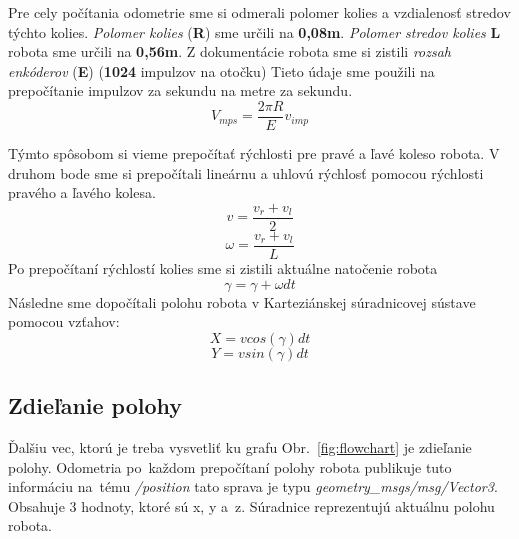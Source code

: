 Pre cely počítania odometrie sme si odmerali polomer kolies a vzdialenosť stredov týchto kolies.
\textit{Polomer kolies} (\textbf{R}) sme určili na \textbf{0,08m}. \textit{Polomer stredov kolies} \textbf{L} robota sme určili
na \textbf{0,56m}. Z dokumentácie robota \cite{encoder} sme si zistili \textit{rozsah enkóderov} (\textbf{E})
(\textbf{1024} impulzov na otočku)  Tieto údaje sme použili na prepočítanie impulzov za sekundu
na metre za sekundu.
\label{mat:vmps}
\[
	V_{mps} = \frac{2 \pi R}{E} v_{imp}
\]

Týmto spôsobom si vieme prepočítať rýchlosti pre pravé a ľavé koleso robota.
V druhom bode sme si prepočítali lineárnu a uhlovú rýchlosť pomocou rýchlosti pravého a ľavého kolesa.
\label{eq:vlin}
\[
	v = \frac{v_{r} + v_{l}}{2}
\]
\label{eq:vang}
\[
	\omega = \frac{v_{r} + v_{l}}{L}
\]
Po prepočítaní rýchlostí kolies sme si zistili aktuálne natočenie robota
\label{eq:angZ}
\[
	\gamma = \gamma + \omega dt
\]
Následne sme dopočítali polohu robota v Karteziánskej súradnicovej sústave pomocou vzťahov:
\label{eq:posX}
\[
	X = v cos(\gamma) dt
\]
\label{eq:posY}
\[
	Y = v sin(\gamma) dt
\]

\subsection{Zdieľanie polohy}
\label{sec:zdielanie_polohy}

Ďalšiu vec, ktorú je treba vysvetliť ku grafu Obr.~\ref{fig:flowchart} je zdieľanie polohy. Odometria po~každom prepočítaní polohy robota publikuje tuto
informáciu na~tému \textit{/position} tato sprava je typu \textit{geometry\_msgs/msg/Vector3}. Obsahuje 3 hodnoty, ktoré sú x, y a~z.
Súradnice reprezentujú aktuálnu polohu robota.

